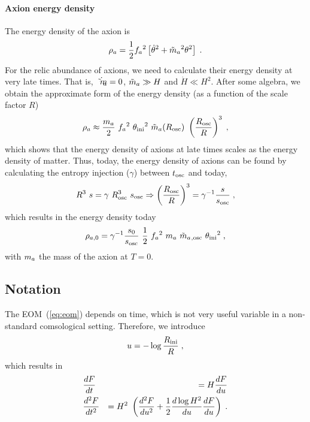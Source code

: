 \documentclass[11pt,a4paper]{article}
\begin{document}
\paragraph{Axion energy density}
%
The energy density of the axion is 
%
\begin{eqnarray}
	\rho_{a} = \dfrac{1}{2} f_{a}{}^2 \left[  \dot{\theta}^2 + \tilde m_{a}{}^2 \theta^2  \right] \;.
	\label{eq:rho_a_def} 
\end{eqnarray}
%
For the relic abundance of axions, we need to calculate their energy density at very late times. That is, $\dot {\tilde m_{a}{}} = 0$, $\tilde m_{a}{} \gg H$ and $\dot H \ll H^2$. After some algebra, we obtain the approximate form of the energy density (as a function of the scale factor $R$) 
%
\begin{eqnarray}
	\rho_{a} \approx \dfrac{m_{a}{} }{2}  \ f_{a}{}^2 \ \theta_{\rm ini}{}^2  \ \tilde m_{a}{}(R_{\rm osc}) \ \left( \dfrac{R_{\rm osc}}{R} \right)^3 \;,
	\label{eq:rho_a0} 
\end{eqnarray}
%
which shows that the energy density of axions at late times scales as the energy density of matter. Thus, today, the energy density of axions can be found by calculating the entropy injection ($\gamma$) between $t_{\rm osc}{}$ and today, \ie
%
\begin{equation}
	R^3 \ s = \gamma \ R_{\rm osc}^3 \ s_{\rm osc} \Rightarrow  \left( \dfrac{R_{\rm osc}}{R} \right)^3 = \gamma^{-1} \dfrac{s}{s_{\rm osc}} \;,
\end{equation}
%
which results in the energy density today
\begin{eqnarray}
	\rho_{a,0} = \gamma^{-1}  \dfrac{s_0}{s_{\rm osc}} \  \dfrac{1 }{2}  \ f_{a}{}^2 \ m_{a}{} \ \tilde m_{a}{}_{,{\rm osc}} \ \theta_{\rm ini}{}^2    \;,
	\label{eq:rho_a_approx} 
\end{eqnarray}
with $m_{a}{}$ the mass of the axion at $T=0$.
%

\subsection{Notation}\label{sec:notation}
%
%
The EOM~(\ref{eq:eom}) depends on time, which is not very useful variable in a non-standard comsological setting. Therefore, we introduce 
%
\begin{eqnarray}
	u = -\log \dfrac{R_{\rm ini}{}}{R} \;,
	\label{eq:natation}
\end{eqnarray}
%
which results in 
%
\begin{eqnarray}
	&\dfrac{d F}{dt} &=  H  \dfrac{d F}{du} 
	\nonumber \\
	&\dfrac{d^2 F}{dt^2} &= H^2 \ \left(  \dfrac{d^2 F}{du^2} + \dfrac{1}{2} \dfrac{d \log H^2}{du}  \dfrac{d F}{du}  \right)\;.
	\label{eq:deriv_u}
\end{eqnarray}
\end{document}
